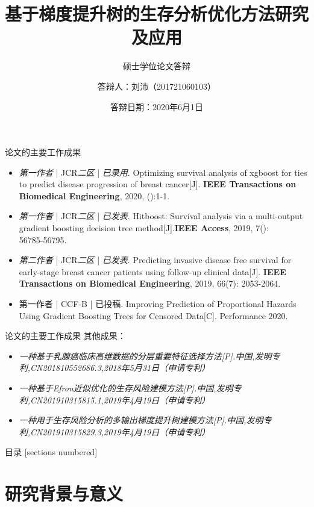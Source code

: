 \documentclass[10pt]{beamer}
\title{基于梯度提升树的生存分析优化方法研究及应用}
\subtitle{硕士学位论文答辩}
\date{答辩日期：2020年6月1日}
\author{答辩人：刘沛（201721060103）}
\institute{电子科技大学计算机科学与工程学院}
\begin{document}
\maketitle

\begin{frame}{论文的主要工作成果}
  \begin{itemize}
  	\item \textit{第一作者} | JCR\textit{二区} | \textit{已录用}. Optimizing survival analysis of xgboost for ties to predict disease progression of breast cancer[J]. \textbf{IEEE Transactions on Biomedical Engineering}, 2020, ():1-1.
    \item \textit{第一作者} | JCR\textit{二区} | \textit{已发表}. Hitboost: Survival analysis via a multi­-output gradient boosting decision tree method[J].\textbf{IEEE Access}, 2019, 7(): 56785­-56795.
    \item \textit{第二作者} | JCR\textit{二区} | \textit{已发表}. Predicting invasive disease­ free survival for early-stage breast cancer patients using follow­-up clinical data[J]. \textbf{IEEE Transactions on Biomedical Engineering}, 2019, 66(7): 2053­-2064.
    \item 第一作者 | CCF-B | 已投稿. Improving Prediction of Proportional Hazards Using Gradient Boosting Trees for Censored Data[C]. Performance 2020.
  \end{itemize}
\end{frame}

\begin{frame}{论文的主要工作成果}
  其他成果：
  \begin{itemize}
    \item \textit{一种基于乳腺癌临床高维数据的分层重要特征选择方法[P].中国,发明专利,CN201810552686.3,2018年5月31日（申请专利）}
    \item \textit{一种基于Efron近似优化的生存风险建模方法[P].中国,发明专利,CN201910315815.1,2019年4月19日（申请专利）}
    \item \textit{一种用于生存风险分析的多输出梯度提升树建模方法[P].中国,发明专利,CN201910315829.3,2019年4月19日（申请专利）}
  \end{itemize}
\end{frame}

\begin{frame}{目录}
  [sections numbered]
  \tableofcontents[hideallsubsections]
\end{frame}

\section{研究背景与意义}
\end{document}
